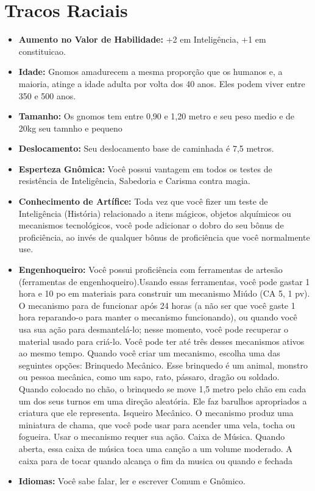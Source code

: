 \documentclass{book}
\begin{document}
\section{Tracos Raciais}
\begin{itemize}
    \item \textbf{Aumento no Valor de Habilidade:} +2 em Inteligência, +1 em constituicao.
    \item \textbf{Idade:} Gnomos amadurecem a mesma proporção que os humanos e, a 
          maioria, atinge a idade adulta por volta dos 40 anos. Eles podem viver 
          entre 350 e 500 anos.
    \item \textbf{Tamanho:} Os gnomos tem entre 0,90 e 1,20 metro e seu peso medio e de
          20kg  seu tamnho e pequeno
    \item \textbf{Deslocamento:} Seu deslocamento base de caminhada é 7,5 metros.
     \item \textbf{Esperteza Gnômica:} Você possui vantagem em todos os testes de resistência 
          de Inteligência, Sabedoria e Carisma contra magia.
    \item \textbf{Conhecimento de Artífice:} Toda vez que você fizer um teste de Inteligência 
          (História) relacionado a itens mágicos, objetos alquímicos ou mecanismos 
          tecnológicos, você pode adicionar o dobro do seu bônus de proficiência,
          ao invés de qualquer bônus de proficiência que você normalmente use.
    \item \textbf{Engenhoqueiro:} Você possui proficiência com ferramentas de artesão 
          (ferramentas de engenhoqueiro).Usando essas ferramentas, você pode gastar 1 
          hora e 10 po em materiais para construir um mecanismo Miúdo (CA 5, 1 pv). O
          mecanismo para de funcionar após 24 horas (a não ser que você gaste 1 hora 
          reparando-o para manter o mecanismo funcionando), ou quando você usa sua ação
          para desmantelá-lo; nesse momento, você pode recuperar o material usado para 
          criá-lo. Você pode ter até três desses mecanismos ativos ao mesmo tempo.
          Quando você criar um mecanismo, escolha uma das seguintes opções:
          Brinquedo Mecânico. Esse brinquedo é um animal, monstro ou pessoa mecânica, 
          como um sapo, rato, pássaro, dragão ou soldado. Quando colocado no chão,
          o brinquedo se move 1,5 metro pelo chão em cada um dos seus turnos em uma direção
         aleatória. Ele faz barulhos apropriados a criatura que ele representa.
         Isqueiro Mecânico. O mecanismo produz uma miniatura de chama, que você pode usar 
         para acender uma vela, tocha ou fogueira. Usar o mecanismo requer sua ação.
         Caixa de Música. Quando aberta, essa caixa de música toca uma canção a um volume
         moderado. A caixa para de tocar quando alcança o fim da musica ou quando e fechada
    \item \textbf{Idiomas:} Você sabe falar, ler e escrever Comum e Gnômico.

\end{itemize}
\end{document}
